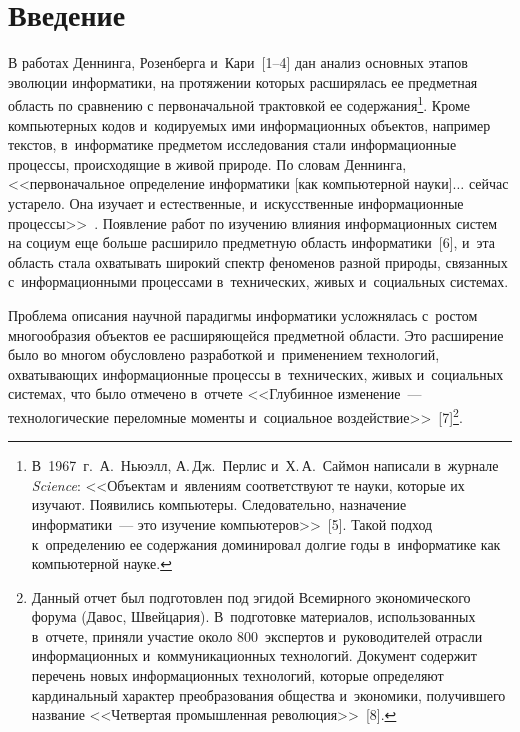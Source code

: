 {\vspace*{-1pt}


\thispagestyle{headings}

\begin{multicols}{2}

\label{st\stat}

\section{Введение} %

\vspace*{-4pt}

  В работах Деннинга, Розенберга и~Кари~[1--4] дан анализ основных 
этапов эволюции информатики, на протяжении которых расширялась ее 
предметная область по сравнению с первоначальной трактовкой ее 
содержания\footnote[2]{В~1967~г.\ А.~Ньюэлл, А.\,Дж.~Перлис 
и~Х.\,А.~Саймон написали в~журнале \textit{Science}: <<Объектам и~явлениям 
соответствуют те науки, которые их изучают. Появились компьютеры. 
Следовательно, назначение информатики~--- это изучение 
компьютеров>>~[5]. Такой подход к~определению ее содержания 
доминировал долгие годы в~информатике как компьютерной науке.}. Кроме 
компьютерных кодов и~кодируемых ими информационных объектов, 
например текстов, в~информатике предметом исследования стали 
информационные процессы, происходящие в живой природе. По словам 
Деннинга, <<первоначальное определение информатики [как компьютерной 
науки]$\ldots$ сейчас устарело. Она изучает и естественные, 
и~искусственные информационные процессы>>~\cite{1-zac}. Появление 
работ по изучению влияния информационных систем на социум еще больше 
расширило предметную область информатики~[6], и~эта об\-ласть стала 
охватывать широкий спектр феноменов разной природы, связанных 
с~информационными процессами в~технических, живых и~социальных 
системах.
  
  Проблема описания научной парадигмы информатики усложнялась 
с~ростом многообразия объектов ее расширяющейся предметной об\-ласти. 
Это расширение было во многом обусловлено разработкой и~применением 
технологий, охватывающих информационные процессы в~технических, 
живых и~социальных сис\-те\-мах, что было отмечено в~отчете <<Глубинное 
изменение~--- технологические переломные моменты и~социальное 
воздействие>>~[7]\footnote[3]{Данный отчет был подготовлен под эгидой 
Всемирного экономического форума (Давос, Швейцария). В~подготовке 
материалов, использованных в~отчете, приняли участие около 800~экспертов 
и~руководителей отрасли информационных и~коммуникационных 
технологий. Документ содержит перечень новых информационных 
технологий, которые определяют кардинальный характер преобразования 
общества и~экономики, получившего название <<Четвертая промышленная 
революция>>~[8].}.
  

\end{multicols}}
